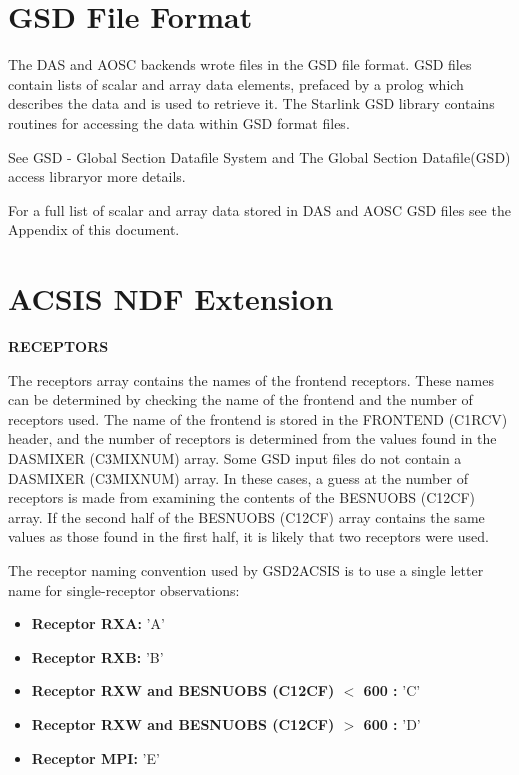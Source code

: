 \documentclass[twoside,11pt]{article}
\newcommand{\htmladdnormallink}[2]{#1}
\newcommand{\xref}[3]{#1}
\newcommand{\xlabel}[1]{}
\renewcommand{\_}{\texttt{\symbol{95}}}
\newcommand{\frontend}{FRONTEND (C1RCV)}
\newcommand{\mixNums}{DAS\_MIXER (C3MIXNUM)}
\newcommand{\centreFreqs}{BES\_NUOBS (C12CF)}
\newcommand{\frontend}{FRONTEND (C1RCV)\ref{GSDVars:frontend}}
\newcommand{\mixNums}{DAS\_MIXER (C3MIXNUM)\ref{GSDVars:mixNums}}
\newcommand{\centreFreqs}{BES\_NUOBS (C12CF)\ref{GSDVars:centreFreqs}}
\begin{document}
\section{\xlabel{GSD_file_format}GSD File Format}
The DAS and AOSC backends wrote files in the GSD file format.  GSD files contain lists of scalar and array data elements, prefaced by a prolog which describes the data and is used to retrieve it.  The Starlink GSD library contains routines for accessing the data within GSD format files.

See \htmladdnormallink{GSD - Global Section Datafile System}{http://docs.jach.hawaii.edu/JCMT/MT/IN/033/mtin033.txt} and \xref{The Global Section Datafile(GSD) access library}{sun229} for more details.

For a full list of scalar and array data stored in DAS and AOSC GSD files see the Appendix of this document.

\section{\xlabel{ACSIS_extension}ACSIS NDF Extension}

{\bf RECEPTORS}

The receptors array contains the names of the frontend receptors.  These names can be determined by checking the name of the frontend and the number of receptors used.  The name of the frontend is stored in the \frontend{} header, and the number of receptors is determined from the values found in the \mixNums{} array.  Some GSD input files do not contain a \mixNums{} array.  In these cases, a guess at the number of receptors is made from examining the contents of the \centreFreqs{} array.  If the second half of the \centreFreqs{} array contains the same values as those found in the first half, it is likely that two receptors were used.

The receptor naming convention used by GSD2ACSIS is to use a single letter name for single-receptor observations:

\begin{itemize}
\item {\bf Receptor RXA:} 'A'
\item {\bf Receptor RXB:} 'B'
\item {\bf Receptor RXW and \centreFreqs{} $<$ 600 :} 'C'
\item {\bf Receptor RXW and \centreFreqs{} $>$ 600 :} 'D'
\item {\bf Receptor MPI:} 'E'
\end{itemize}
\end{document}

